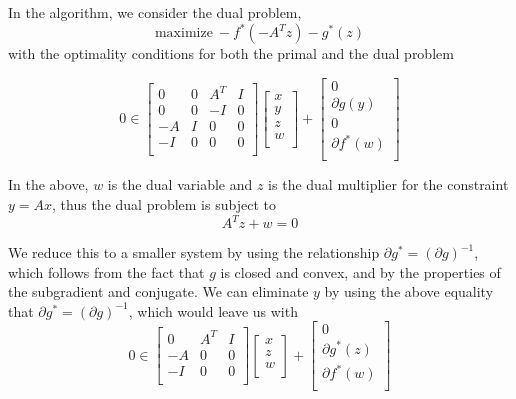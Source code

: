 \documentclass{article}
\theoremstyle{definition}
\theoremstyle{remark}
\begin{document}
In the algorithm, we consider the dual problem, 
\begin{equation}
  \text{maximize} \ -f^*(-A^T z) - g^*(z)
\end{equation}
with the optimality conditions for both the primal and the dual problem 

\[
0 \in 
\begin{bmatrix}
  0 & 0 & A^T & I \\
  0 & 0 & -I & 0 \\
  -A & I & 0 & 0 \\
  -I & 0 & 0 & 0 \\
\end{bmatrix}
\begin{bmatrix}
  x \\
  y \\ 
  z \\
  w \\
\end{bmatrix} 
+ 
\begin{bmatrix}
  0 \\
  \partial g(y) \\
  0 \\
  \partial f^*(w) \\
\end{bmatrix}
\]

In the above, $w$ is the dual variable and $z$ is the dual multiplier for the constraint $y = Ax$, thus the dual problem is subject to
\begin{equation*}
  A^T z + w = 0
\end{equation*}

We reduce this to a smaller system by using the relationship $\partial g^* = {(\partial g)}^{-1}$, which follows from the fact that $g$ is closed and convex, and by the properties of the subgradient and conjugate. We can eliminate $y$ by using the above equality that $\partial g^* = {(\partial g)}^{-1}$, which would leave us with
\[
0 \in 
\begin{bmatrix}
  0 & A^T & I \\
  -A & 0 & 0 \\
  -I & 0 & 0 \\
\end{bmatrix}
\begin{bmatrix}
  x \\
  z \\
  w \\
\end{bmatrix}  
+
\begin{bmatrix}
  0 \\
  \partial g^*(z) \\
  \partial f^*(w) \\
\end{bmatrix}
\]
\end{document}
